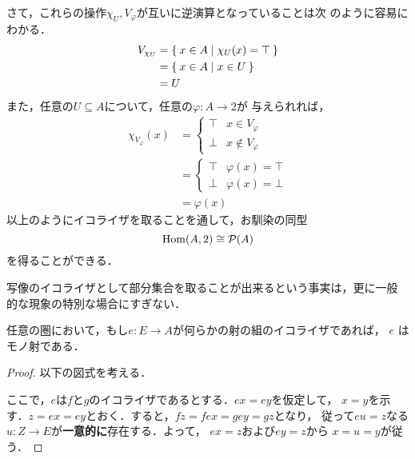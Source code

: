 \begin{example}
 さて，これらの操作$\chi_U, V_\varphi$が互いに逆演算となっていることは次
 のように容易にわかる．
 \begin{align*}
  V_{\chi_U} &= \Set{x \in A | \chi_U(x) = \top}\\
             &= \Set{x \in A | x \in U}\\
             &= U
 \end{align*}
 また，任意の$U \subseteq A$について，任意の$\varphi: A \to 2$が
 与えられれば，
 \begin{align*}
  \chi_{V_\varphi}(x) &= \begin{cases}
			  \top & x \in V_\varphi\\
			  \bot & x \notin V_\varphi
			 \end{cases}\\
  &= \begin{cases}
      \top & \varphi(x) = \top\\
      \bot & \varphi(x) = \bot
     \end{cases}\\
  &= \varphi(x)
 \end{align*}
 以上のようにイコライザを取ることを通して，お馴染の同型
 \[
  \mathrm{Hom}(A, 2) \cong \mathcal{P}(A)
 \]
 を得ることができる．
\end{example}

写像のイコライザとして部分集合を取ることが出来るという事実は，更に一般
的な現象の特別な場合にすぎない．

\begin{prop}\label{Prop:Equalizer is Monic}
 任意の圏において，もし$e: E \to A$が何らかの射の組のイコライザであれば，
 $e$ はモノ射である．
\end{prop}
\begin{proof}
 以下の図式を考える．
 \begin{center}
 \end{center}
 ここで，$e$は$f$と$g$のイコライザであるとする．$ex = ey$を仮定して，
 $x = y$を示す．$z = ex = ey$とおく．すると，$fz = fex = gey = gz$となり，
 従って$eu = z$なる$u: Z \to E$が{\bfseries 一意的に}存在する．よって，
 $ex = z$および$ey = z$から $x = u = y$が従う．
\end{proof}

